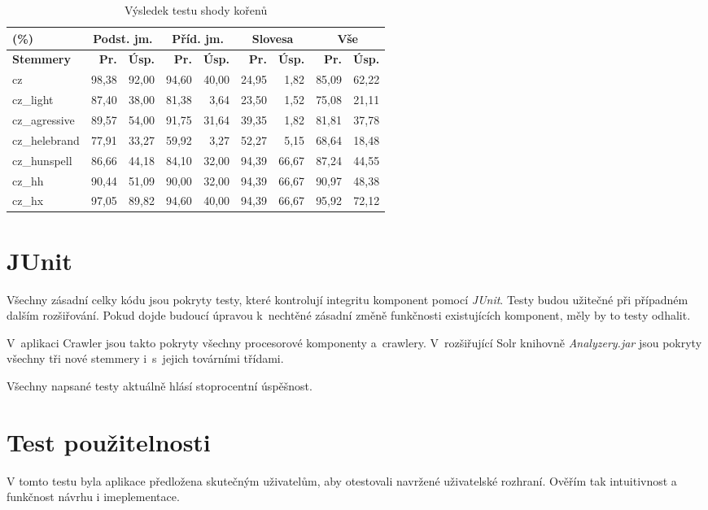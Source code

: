 \begin{table}
\begin{center}
\begin{tabular}{|l|r|r|r|r|r|r|r|r|}
\hline
(\%) & \multicolumn{2}{|c|}{\textbf{Podst. jm.}} & \multicolumn{2}{|c|}{\textbf{Příd. jm.}} & \multicolumn{2}{|c|}{\textbf{Slovesa}} & \multicolumn{2}{|c|}{\textbf{Vše}} \\ \hline
\textbf{Stemmery} & \textbf{Pr.} & \textbf{Úsp.} & \textbf{Pr.} & \textbf{Úsp.} & \textbf{Pr.} & \textbf{Úsp.} & \textbf{Pr.} & \textbf{Úsp.} \\ \hline
cz & 98,38 & 92,00 & 94,60 & 40,00 & 24,95 & 1,82 & 85,09 & 62,22 \\ \hline
cz\_light & 87,40 & 38,00 & 81,38 & 3,64 & 23,50 & 1,52 & 75,08 & 21,11 \\ \hline
cz\_agressive & 89,57 & 54,00 & 91,75 & 31,64 & 39,35 & 1,82 & 81,81 & 37,78 \\ \hline
cz\_helebrand & 77,91 & 33,27 & 59,92 & 3,27 & 52,27 & 5,15 & 68,64 & 18,48 \\ \hline
cz\_hunspell & 86,66 & 44,18 & 84,10 & 32,00 & 94,39 & 66,67 & 87,24 & 44,55 \\ \hline
\hline
cz\_hh & 90,44 & 51,09 & 90,00 & 32,00 & 94,39 & 66,67 & 90,97 & 48,38 \\ \hline
cz\_hx & 97,05 & 89,82 & 94,60 & 40,00 & 94,39 & 66,67 & 95,92 & 72,12 \\ \hline
\end{tabular}
\end{center}
\caption{Výsledek testu shody kořenů}
\label{tab:test_eql}
\end{table}

\section{JUnit}
Všechny zásadní celky kódu jsou pokryty testy, které kontrolují integritu komponent pomocí \emph{JUnit}. Testy budou užitečné při případném dalším rozšiřování. Pokud dojde budoucí úpravou k~nechtěné zásadní změně funkčnosti existujících komponent, měly by to testy odhalit.

V~aplikaci Crawler jsou takto pokryty všechny procesorové komponenty a~crawlery. V~rozšiřující Solr knihovně \emph{Analyzery.jar} jsou pokryty všechny tři nové stemmery i~s~jejich továrními třídami.

Všechny napsané testy aktuálně hlásí stoprocentní úspěšnost.

\section{Test použitelnosti}
V tomto testu byla aplikace předložena skutečným uživatelům, aby otestovali navržené uživatelské rozhraní. Ověřím tak intuitivnost a funkčnost návrhu i imeplementace.

